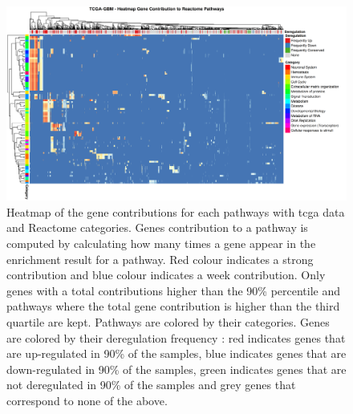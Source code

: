 \begin{figure}[h]
    \centering
    \includegraphics[width=\textwidth]{img/gene_contrib_reactome_tcga}
    \caption {
        Heatmap of the gene contributions for each pathways with \acrshort{tcga} data and Reactome categories.
        Genes contribution to a pathway is computed by calculating how many times a gene appear in the enrichment result for a pathway.
        Red colour indicates a strong contribution and blue colour indicates a week contribution.
        Only genes with a total contributions higher than the 90\% percentile and pathways where the total gene contribution is higher than the third quartile are kept.
        Pathways are colored by their categories.
        Genes are colored by their deregulation frequency : red indicates genes that are up-regulated in 90\% of the samples, blue indicates genes that are down-regulated in 90\% of the samples, green indicates genes that are not deregulated in 90\% of the samples and grey genes that correspond to none of the above.
    }
    \label{supp:gene-contrib-reactome-tcga}
\end{figure}